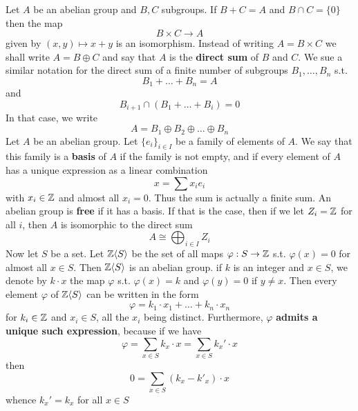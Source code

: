 \documentclass[11pt]{article}
\begin{document}
Let \(A\) be an abelian group and \(B,C\) subgroups. If \(B+C=A\) and \(B\cap C=\{0\}\) then the map
\begin{equation*}
B\times C\to A
\end{equation*}
given by \((x,y)\mapsto x+y\) is an isomorphism. Instead of writing \(A=B\times C\) we shall
write \(A=B\oplus C\) and say that \(A\) is the \textbf{direct sum} of \(B\) and \(C\). We sue a similar
notation for the direct sum of a finite number of subgroups \(B_1,\dots,B_n\) s.t.
\begin{equation*}
B_1+\dots+B_n=A
\end{equation*}
and
\begin{equation*}
B_{i+1}\cap(B_1+\dots+B_i)=0
\end{equation*}
In that case, we write
\begin{equation*}
A=B_1\oplus B_2\oplus\dots\oplus B_n
\end{equation*}
Let \(A\) be an abelian group. Let \(\{e_i\}_{i\in I}\) be a family of elements of \(A\). We say that
this family is a \textbf{basis} of \(A\) if the family is not empty, and if every element of \(A\) has a
unique expression as a linear combination
\begin{equation*}
x=\sum x_ie_i
\end{equation*}
with \(x_i\in\mathbb{Z}\) and almost all \(x_i=0\). Thus the sum is actually a finite sum. An abelian group is
\textbf{free} if it has a basis. If that is the case, then if we let \(Z_i=\mathbb{Z}\) for all \(i\), then \(A\) is
isomorphic to the direct sum
\begin{equation*}
A\cong\bigoplus_{i\in I}Z_i
\end{equation*}
Now let \(S\) be a set. Let \(\mathbb{Z}\langle S\rangle\) be the set of all maps \(\varphi:S\to\mathbb{Z}\) s.t. \(\varphi(x)=0\) for
almost all \(x\in S\). Then \(\mathbb{Z}\langle S\rangle\) is an abelian group. if \(k\) is an integer and \(x\in S\),
we denote by \(k\cdot x\) the map \(\varphi\) s.t. \(\varphi(x)=k\) and \(\varphi(y)=0\) if \(y\neq x\). Then every element
\(\varphi\) of \(\mathbb{Z}\langle S\rangle\) can be written in the form
\begin{equation*}
\varphi=k_1\cdot x_1+\dots+k_n\cdot x_n
\end{equation*}
for \(k_i\in\mathbb{Z}\) and \(x_i\in S\), all the \(x_i\) being distinct. Furthermore, \(\varphi\)
\textbf{admits a unique such expression}, because if we have
\begin{equation*}
\varphi=\sum_{x\in S}k_x\cdot x=\sum_{x\in S}k_x'\cdot x
\end{equation*}
then
\begin{equation*}
0=\sum_{x\in S}(k_x-k'_x)\cdot x
\end{equation*}
whence \(k_x'=k_x\) for all \(x\in S\)
\end{document}
